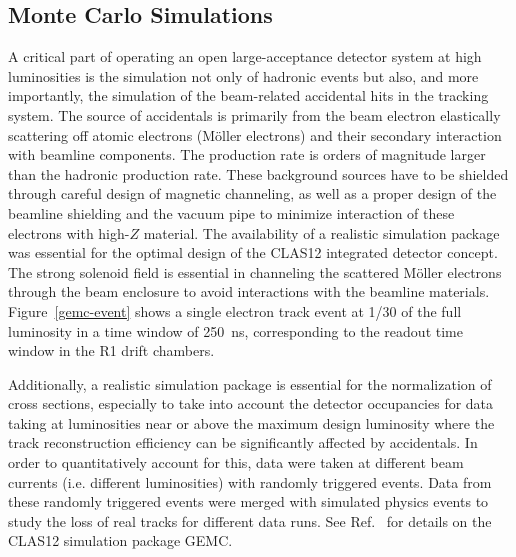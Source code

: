 \documentclass[final,3p,twocolumn]{elsarticle}
\begin{document}
\subsection{Monte Carlo Simulations} 

A critical part of operating an open large-acceptance detector system at high luminosities is the simulation not only of
hadronic events but also, and more importantly, the simulation of the beam-related accidental hits in the tracking system.
The source of accidentals is primarily from the beam electron elastically scattering off atomic electrons (M{\"o}ller
electrons) and their secondary interaction with beamline components. The production rate is orders of magnitude larger
than the hadronic production rate. These background sources have to be shielded through careful design of magnetic
channeling, as well as a proper design of the beamline shielding and the vacuum pipe to minimize interaction of these
electrons with high-$Z$ material. The availability of a realistic simulation package was essential for the optimal design
of the CLAS12 integrated detector concept. The strong solenoid field is essential in channeling the scattered M{\"o}ller
electrons through the beam enclosure to avoid interactions with the beamline materials. Figure~\ref{gemc-event}  shows
a single electron track event at 1/30 of the full luminosity in a time window of 250~ns, corresponding to the readout time
window in the R1 drift chambers. 
 
Additionally, a realistic simulation package is essential for the normalization of cross sections, especially to take into
account the detector occupancies for data taking at luminosities near or above the maximum design luminosity where the
track reconstruction efficiency can be significantly affected by accidentals. In order to quantitatively account for this,
data were taken at different beam currents (i.e. different luminosities) with randomly triggered events. Data from these 
randomly triggered events were merged with simulated physics events to study the loss of real tracks for different 
data runs. See Ref.~\cite{GEMC} for details on the CLAS12 simulation package GEMC.
\end{document}
